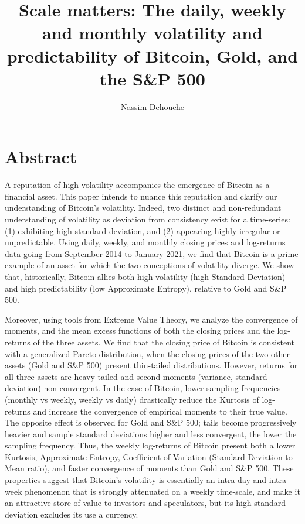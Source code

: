 \documentclass[12pt]{article}
\title{Scale matters: The daily, weekly and monthly volatility and predictability of Bitcoin, Gold, and the S\&P 500}
\author{Nassim Dehouche}
\date{}
\begin{document}
\maketitle
\section*{Abstract}
A reputation of high volatility accompanies the emergence of Bitcoin as a financial asset. This paper intends to nuance this reputation and clarify our understanding of Bitcoin's volatility. Indeed, two distinct and non-redundant understanding of volatility as deviation from consistency exist for a time-series: (1) exhibiting high standard deviation, and (2) appearing highly irregular or unpredictable. Using daily, weekly, and monthly closing prices and log-returns data going from September 2014 to January 2021, we find that Bitcoin is a prime example of an asset for which the two conceptions of volatility diverge. We show that, historically, Bitcoin allies both high volatility (high Standard Deviation) and high predictability (low Approximate Entropy), relative to Gold and S\&P 500.  

Moreover, using tools from Extreme Value Theory, we analyze the convergence of moments, and the mean excess functions of both the closing prices and the log-returns of the three assets. We find that the closing price of Bitcoin is consistent with a generalized Pareto distribution, when the closing prices of the two other assets (Gold and S\&P 500) present thin-tailed distributions. However, returns for all three assets are heavy tailed and second moments (variance, standard deviation) non-convergent. In the case of Bitcoin, lower sampling frequencies (monthly vs weekly, weekly vs daily) drastically reduce the Kurtosis of log-returns and increase the convergence of empirical moments to their true value. The opposite effect is observed for Gold and S\&P 500; tails become progressively heavier and sample standard deviations higher and less convergent, the lower the sampling frequency. Thus, the weekly log-returns of Bitcoin present both a lower Kurtosis, Approximate Entropy, Coefficient of Variation (Standard Deviation to Mean ratio), and faster convergence of moments than Gold and S\&P 500. These properties suggest that Bitcoin's volatility is essentially an intra-day and intra-week phenomenon that is strongly attenuated on a weekly time-scale, and make it an attractive store of value to investors and speculators, but its high standard deviation excludes its use a currency.
\end{document}
